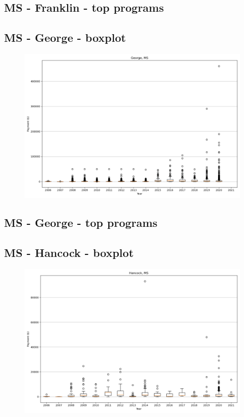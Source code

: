 \subsection*{MS - Franklin - top programs}

\newpage
\subsection*{MS - George - boxplot}
\begin{figure}[h]
\centering
\includegraphics[width=7in]{../output/boxplots/counties/George-MS_boxplot.png}
\end{figure}


\subsection*{MS - George - top programs}

\newpage
\subsection*{MS - Hancock - boxplot}
\begin{figure}[h]
\centering
\includegraphics[width=7in]{../output/boxplots/counties/Hancock-MS_boxplot.png}
\end{figure}


